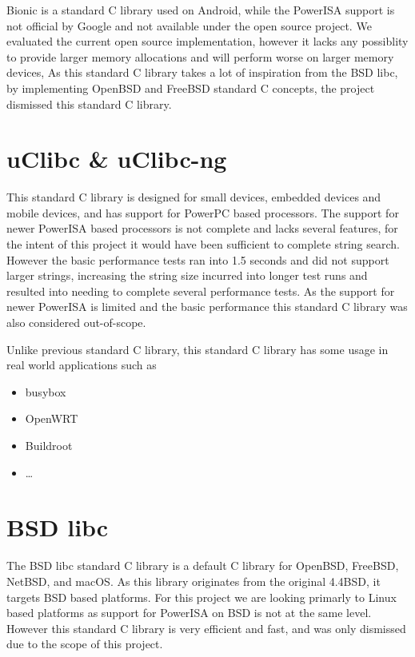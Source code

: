Bionic is a standard C library used on Android, while the PowerISA support is not official by Google and not available under the open source project.
We evaluated the current open source implementation, however it lacks any possiblity to provide larger memory allocations
and will perform worse on larger memory devices,
As this standard C library takes a lot of inspiration from the BSD libc, by implementing OpenBSD and FreeBSD standard C concepts,
the project dismissed this standard C library.
\par

\section{uClibc \& uClibc-ng}
\label{content:uclibc}

This standard C library is designed for small devices, embedded devices and mobile devices, and has support for PowerPC based processors.
The support for newer PowerISA based processors is not complete and lacks several features,
for the intent of this project it would have been sufficient to complete string search.
However the basic performance tests ran into 1.5 seconds and did not support larger strings,
increasing the string size incurred into longer test runs and resulted into needing to complete several performance tests.
As the support for newer PowerISA is limited and the basic performance this standard C library was also considered out-of-scope.
\par

Unlike previous standard C library, this standard C library has some usage in real world applications such as
\begin{itemize}
\item
busybox
\item
OpenWRT
\item
Buildroot
\item
\ldots
\end{itemize}

\section{BSD libc}

The BSD libc standard C library is a default C library for OpenBSD, FreeBSD, NetBSD, and macOS.
As this library originates from the original 4.4BSD, it targets BSD based platforms.
For this project we are looking primarly to Linux based platforms as support for PowerISA on BSD is not at the same level.
However this standard C library is very efficient and fast, and was only dismissed due to the scope of this project.
\par

